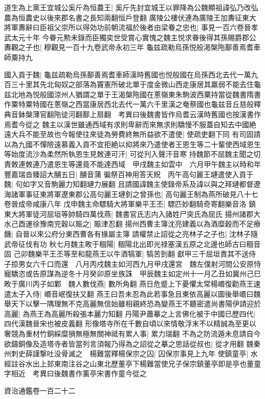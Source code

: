 道生為上黨王宜城公奚斤為恒農王|{
	奚斤先封宜城王以罪降為公魏顯祖諱弘乃改弘農為恒農史以後來郡名書之長知兩翻恒戶登翻}
廣陵公樓伏連為廣陵王加夀征東大將軍夀辭曰臣祖父崇所以得効功前朝流福於後者由梁眷之忠也|{
	事見一百六卷晉孝武太元十年}
今眷元勲未錄而臣獨奕世受賞心實愧之魏主悦求眷後得其孫賜爵郡公夀觀之子也|{
	穆觀見一百十九卷武帝永初三年}
龜兹疏勒烏孫悦般渇槃陁鄯善焉耆車師粟持九

國入貢于魏|{
	龜兹疏勒烏孫鄯善焉耆車師漢時舊國也悦般國在烏孫西北去代一萬九百三十里其先北匈奴之部落為竇憲所破北單于度金微山西走康居其羸弱不能去住龜兹北地為悦般國涼州人猶謂之單于王渴槃陁國在蔥嶺東朱駒波西粟持當從魏書隋書作粟特粟特國在蔥嶺之西當康居西北去代一萬六千里漢之奄蔡國也龜兹音丘慈般釋典音鉢槃薄官翻陁徒河翻鄯上扇翻　考異曰後魏書皆作烏耆云漢時舊國也按漢書作焉耆今從之}
魏主以漢世雖通西域有求則卑辭而來無求則驕慢不服蓋自知去中國絶遠大兵不能至故也今報使往來徒為勞費終無所益欲不遣使|{
	使疏吏翻下同}
有司固請以為九國不憚險遠慕義入貢不宜拒絶以抑將來乃遣使者王恩生等二十輩使西域恩生等始度流沙為柔然所執恩生見敇連可汗|{
	可從刋入聲汗音寒}
持魏節不屈魏主聞之切責敇連敇連乃遣恩生等還竟不能達西域　甲戌魏主如雲中　六月甲午魏主以時和年豐嘉瑞沓臻詔大酺五日|{
	酺音蒲}
徧祭百神用答天貺　丙午高句麗王璉遣使入貢于魏|{
	句如字又音駒麗力知翻璉力展翻}
且請國諱魏主使錄帝系及諱以與之拜璉都督遼海諸軍事征東將軍遼東郡公高句麗王璉釗之曾孫也|{
	高句麗王制為燕所破見八十七卷晉成帝咸康八年}
戊申魏主命驃騎大將軍樂平王丕|{
	驃匹妙翻騎奇寄翻樂音洛}
鎮東大將軍徒河屈垣等帥騎四萬伐燕|{
	魏書官氏志内入諸姓尸突氏為屈氏}
揚州諸郡大水己酉運徐豫南兖穀以賑之|{
	賑津忍翻}
揚州西曹主簿沈亮建義以為酒糜穀而不足療饑|{
	自晉以來公府分東西曹各有掾屬主簿}
請權禁止詔從之亮林子之子也|{
	沈林子隨武帝征伐有功}
秋七月魏主畋于稒陽|{
	稒陽北出即光禄塞漢五原之北邊也師古曰稒音固}
己卯魏樂平王丕等至和龍燕王以牛酒犒軍|{
	犒苦到翻}
獻甲三千屈垣責其不送侍子掠男女六千口而還　八月丙戍魏主如河西九月甲戌還宮　魏左僕射河間公安原恃寵驕恣或告原謀為逆冬十月癸卯原坐族誅　甲辰魏主如定州十一月乙丑如冀州己巳畋于廣川丙子如鄴　魏人數伐燕|{
	數所角翻}
燕日危蹙上下憂懼太常楊㟭復勸燕王速遣太子入侍|{
	㟭音岷復扶又翻}
燕王曰吾未忍為此若事急且東依高麗以圖後舉㟭曰魏舉天下以擊一隅理無不克高麗無信始雖相親終恐為變燕王不聽密遣尚書陽伊請迎於高麗|{
	為燕王為高麗所殺張本麗力知翻}
丹陽尹蕭摹之上言佛化被于中國已歷四代|{
	四代漢魏晉宋也被皮義翻}
形像塔寺所在千數自頃以來情敬浮末不以精誠為至更以奢競為重材竹銅綵糜損無極無關神祗有累人事|{
	累力瑞翻}
不為之防流遁未息請自今欲鑄銅像及造塔寺者皆當列言須報乃得為之詔從之摹之思話從叔也|{
	從才用翻}
魏秦州刺史薛謹撃吐没骨滅之　楊難當釋楊保宗之囚|{
	囚保宗事見上九年}
使鎮童亭|{
	水經註谷水出上邽東南注谷之山東北歷董亭下楊難當使兄子保宗鎮董亭即是亭也董童字相近　考異曰後魏書作薰亭宋書作童今從之}


資治通鑑卷一百二十二
